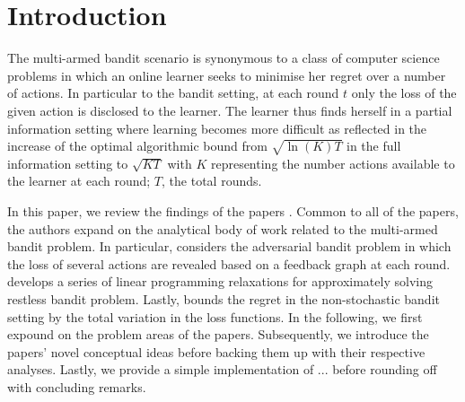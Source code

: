 \section{Introduction}

The multi-armed bandit scenario is synonymous to a class of computer science problems in which an online learner seeks to minimise her regret over a number of actions. In particular to the bandit setting, at each round $t$ only the loss of the given action is disclosed to the learner. The learner thus finds herself in a partial information setting where learning becomes more difficult as reflected in the increase of the optimal algorithmic bound from $\sqrt{\ln(K)T}$ in the full information setting to $\sqrt{KT}$ with $K$ representing the number actions available to the learner at each round; $T$, the total rounds. 

In this paper, we review the findings of the papers \citep{alon, hazan, bertsimas}. Common to all of the papers, the authors expand on the analytical body of work related to the multi-armed bandit problem. In particular, \citep{alon} considers the adversarial bandit problem in which the loss of several actions are revealed based on a feedback graph at each round. \citep{hazan} develops a series of linear programming relaxations for approximately solving restless bandit problem. Lastly, \citep{bertsimas} bounds the regret in the non-stochastic bandit setting by the total variation in the loss functions. In the following, we first expound on the problem areas of the papers. Subsequently, we introduce the papers' novel conceptual ideas before backing them up with their respective analyses. Lastly, we provide a simple implementation of ... before rounding off with concluding remarks.